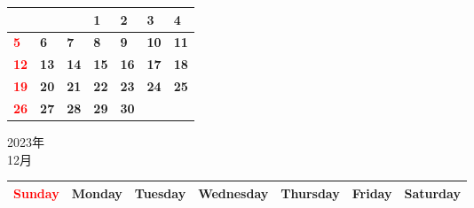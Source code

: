 \documentclass[a4paper,landscape]{jsarticle}
\newcommand{\dig}{\hspace{29mm}}
\newcommand{\tdig}{\hspace{27mm}}
\newcommand{\LBF}{\LARGE\textbf}
\begin{document}
\begingroup
\renewcommand{\arraystretch}{4}
\begin{tabular}{|p{32mm}|p{32mm}|p{32mm}|p{32mm}|p{32mm}|p{32mm}|p{32mm}|}
\hline
&&&\raisebox{30pt} {\dig\LBF{1}}&\raisebox{30pt} {\dig\LBF{2}}&\raisebox{30pt} {\dig\LBF{3}}&\raisebox{30pt} {\dig\LBF{4}}\\
\hline
\raisebox{30pt} {\dig\textcolor{red}{\LBF{5}}}&\raisebox{30pt} {\dig\LBF{6}}&\raisebox{30pt} {\dig\LBF{7}}&\raisebox{30pt} {\dig\LBF{8}}&\raisebox{30pt} {\dig\LBF{9}}&\raisebox{30pt} {\tdig\LBF{10}}&\raisebox{30pt} {\tdig\LBF{11}}\\
\hline
\raisebox{30pt} {\tdig\textcolor{red}{\LBF{12}}}&\raisebox{30pt} {\tdig\LBF{13}}&\raisebox{30pt} {\tdig\LBF{14}}&\raisebox{30pt} {\tdig\LBF{15}}&\raisebox{30pt} {\tdig\LBF{16}}&\raisebox{30pt} {\tdig\LBF{17}}&\raisebox{30pt} {\tdig\LBF{18}}\\
\hline
\raisebox{30pt} {\tdig\textcolor{red}{\LBF{19}}}&\raisebox{30pt} {\tdig\LBF{20}}&\raisebox{30pt} {\tdig\LBF{21}}&\raisebox{30pt} {\tdig\LBF{22}}&\raisebox{30pt} {\tdig\LBF{23}}&\raisebox{30pt} {\tdig\LBF{24}}&\raisebox{30pt} {\tdig\LBF{25}}\\
\hline
\raisebox{30pt} {\tdig\textcolor{red}{\LBF{26}}}&\raisebox{30pt} {\tdig\LBF{27}}&\raisebox{30pt} {\tdig\LBF{28}}&\raisebox{30pt} {\tdig\LBF{29}}&\raisebox{30pt} {\tdig\LBF{30}}&&\\
\hline
\end{tabular}
\endgroup

\newpage

\begin{center}
	\LARGE 2023年\\
	\LARGE 12月
\end{center}

\begingroup
\renewcommand{\arraystretch}{1.4}
\begin{tabular}{|>{\centering\arraybackslash}p{32mm}|>{\centering\arraybackslash}p{32mm}|>{\centering\arraybackslash}p{32mm}|>{\centering\arraybackslash}p{32mm}|>{\centering\arraybackslash}p{32mm}|>{\centering\arraybackslash}p{32mm}|>{\centering\arraybackslash}p{32mm}|}
\hline
\textcolor{red}{\large Sunday}&\large Monday&\large Tuesday&\large Wednesday&\large Thursday&\large Friday&\large Saturday\\
\hline
\end{tabular}
\endgroup
\end{document}
